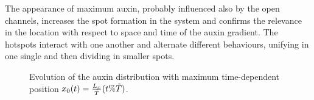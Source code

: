 The appearance of maximum auxin, probably influenced also by the open channels, increases the spot formation in the system and confirms the relevance in the location with respect to space and time of the auxin gradient. The hotspots interact with one another and alternate different behaviours, unifying in one single and then dividing in smaller spots.
\begin{figure}[H]
    \centering
    \quad
    \quad
    \caption[Time dependent auxin - moving max]{Evolution of the auxin distribution with maximum time-dependent position $x_0(t) = \frac{L_x}{\Tilde{T}} (t\% \Tilde{T})$.}
    \label{fig:A1}
\end{figure}
